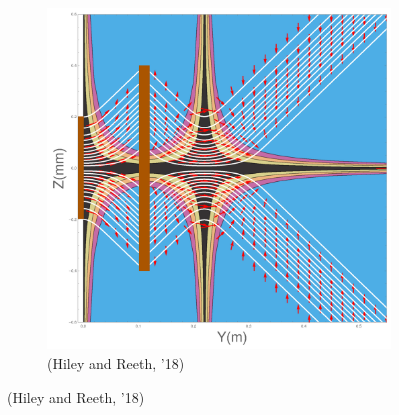 \documentclass[compress,10pt,usenames,dvipsnames]{beamer}
\theoremstyle{remark}
\begin{document}
\begin{frame}
\begin{figure}
\begin{subfigure}[t]{.5\textwidth}
			\caption*{(Hiley and Reeth, '18)}
			\includegraphics[scale=0.08]{Figures/potential_surreal.png}
			

\end{subfigure}
\end{figure}
\end{frame}
\end{document}
